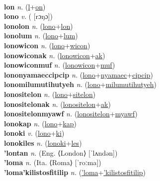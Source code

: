  \label{lolum} \\
\textbf{lon} \textit{n.} (\hyperref[l]{l}+\hyperref[on]{on})
 \label{lon} \\
\textbf{lono} \textit{v.} ( [rɔŋɔ])
 \label{lono} \\
\textbf{lonolon} \textit{n.} (\hyperref[lono]{lono}+\hyperref[lon]{lon})
 \label{lonolon} \\
\textbf{lonolum} \textit{n.} (\hyperref[lono]{lono}+\hyperref[lum]{lum})
 \label{lonolum} \\
\textbf{lonowicon} \textit{n.} (\hyperref[lono]{lono}+\hyperref[wicon]{wicon})
 \label{lonowicon} \\
\textbf{lonowiconak} \textit{n.} (\hyperref[lonowicon]{lonowicon}+\hyperref[ak]{ak})
 \label{lonowiconak} \\
\textbf{lonowiconmuf} \textit{n.} (\hyperref[lonowicon]{lonowicon}+\hyperref[muf]{muf})
 \label{lonowiconmuf} \\
\textbf{lononyamaeccipcip} \textit{n.} (\hyperref[lono]{lono}+\hyperref[nyamaec]{nyamaec}+\hyperref[cipcip]{cipcip})
 \label{lononyamaeccipcip} \\
\textbf{lonomilumutihutyeh} \textit{n.} (\hyperref[lono]{lono}+\hyperref[milumutihutyeh]{milumutihutyeh})
 \label{lonomilumutihutyeh} \\
\textbf{lonositelon} \textit{n.} (\hyperref[lono]{lono}+\hyperref[sitelon]{sitelon})
 \label{lonositelon} \\
\textbf{lonositelonak} \textit{n.} (\hyperref[lonositelon]{lonositelon}+\hyperref[ak]{ak})
 \label{lonositelonak} \\
\textbf{lonositelonmyawf} \textit{n.} (\hyperref[lonositelon]{lonositelon}+\hyperref[myawf]{myawf})
 \label{lonositelonmyawf} \\
\textbf{lonokap} \textit{n.} (\hyperref[lono]{lono}+\hyperref[kap]{kap})
 \label{lonokap} \\
\textbf{lonoki} \textit{v.} (\hyperref[lono]{lono}+\hyperref[ki]{ki})
 \label{lonoki} \\
\textbf{lonokiles} \textit{n.} (\hyperref[lonoki]{lonoki}+\hyperref[les]{les})
 \label{lonokiles} \\
\textbf{'lontan} \textit{n.} (Eng. ⟨London⟩ [ˈlʌndən])
 \label{'lontan} \\
\textbf{'loma} \textit{n.} (Ita. ⟨Roma⟩ [ˈroːma])
 \label{'loma} \\
\textbf{'loma'kilistosfitilip} \textit{n.} (\hyperref['loma]{'loma}+\hyperref['kilistosfitilip]{'kilistosfitilip})
 \label{'loma'kilistosfitilip} \\

